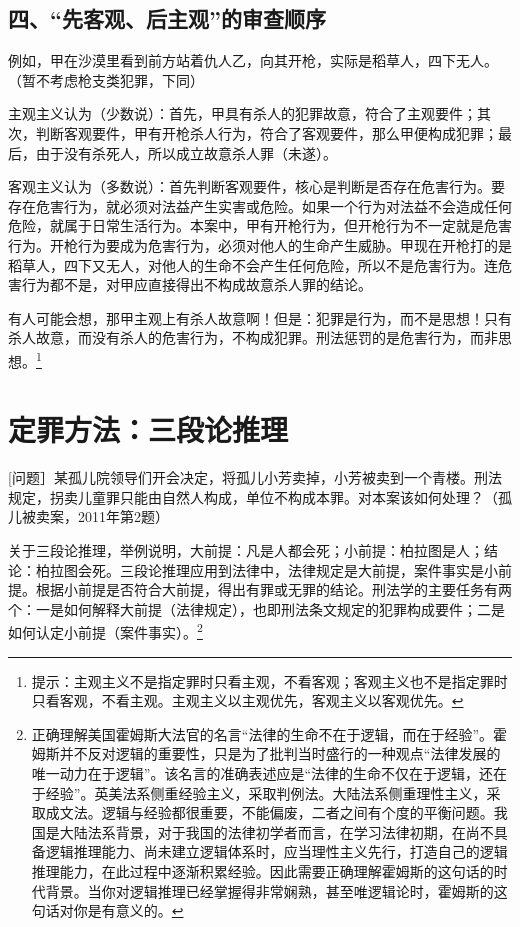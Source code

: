 \subsection*{四、“先客观、后主观”的审查顺序}

例如，甲在沙漠里看到前方站着仇人乙，向其开枪，实际是稻草人，四下无人。（暂不考虑枪支类犯罪，下同）

主观主义认为（少数说）：首先，甲具有杀人的犯罪故意，符合了主观要件；其次，判断客观要件，甲有开枪杀人行为，符合了客观要件，那么甲便构成犯罪；最后，由于没有杀死人，所以成立故意杀人罪（未遂）。

客观主义认为（多数说）：首先判断客观要件，核心是判断是否存在危害行为。要存在危害行为，就必须对法益产生实害或危险。如果一个行为对法益不会造成任何危险，就属于日常生活行为。本案中，甲有开枪行为，但开枪行为不一定就是危害行为。开枪行为要成为危害行为，必须对他人的生命产生威胁。甲现在开枪打的是稻草人，四下又无人，对他人的生命不会产生任何危险，所以不是危害行为。连危害行为都不是，对甲应直接得出不构成故意杀人罪的结论。

有人可能会想，那甲主观上有杀人故意啊！但是：犯罪是行为，而不是思想！只有杀人故意，而没有杀人的危害行为，不构成犯罪。刑法惩罚的是危害行为，而非思想。\footnote{提示：主观主义不是指定罪时只看主观，不看客观；客观主义也不是指定罪时只看客观，不看主观。主观主义以主观优先，客观主义以客观优先。}

\section{定罪方法：三段论推理}

[问题］某孤儿院领导们开会决定，将孤儿小芳卖掉，小芳被卖到一个青楼。刑法规定，拐卖儿童罪只能由自然人构成，单位不构成本罪。对本案该如何处理？（孤儿被卖案，2011年第2题）

关于三段论推理，举例说明，大前提：凡是人都会死；小前提：柏拉图是人；结论：柏拉图会死。三段论推理应用到法律中，法律规定是大前提，案件事实是小前提。根据小前提是否符合大前提，得出有罪或无罪的结论。刑法学的主要任务有两个：一是如何解释大前提（法律规定），也即刑法条文规定的犯罪构成要件；二是如何认定小前提（案件事实）。\footnote{正确理解美国霍姆斯大法官的名言“法律的生命不在于逻辑，而在于经验”。霍姆斯并不反对逻辑的重要性，只是为了批判当时盛行的一种观点“法律发展的唯一动力在于逻辑”。该名言的准确表述应是“法律的生命不仅在于逻辑，还在于经验”。英美法系侧重经验主义，采取判例法。大陆法系侧重理性主义，采取成文法。逻辑与经验都很重要，不能偏废，二者之间有个度的平衡问题。我国是大陆法系背景，对于我国的法律初学者而言，在学习法律初期，在尚不具备逻辑推理能力、尚未建立逻辑体系时，应当理性主义先行，打造自己的逻辑推理能力，在此过程中逐渐积累经验。因此需要正确理解霍姆斯的这句话的时代背景。当你对逻辑推理已经掌握得非常娴熟，甚至唯逻辑论时，霍姆斯的这句话对你是有意义的。}

